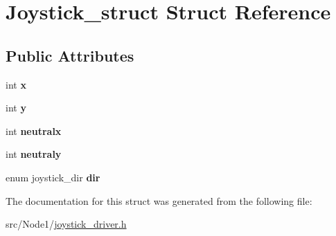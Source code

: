 \hypertarget{structJoystick__struct}{}\section{Joystick\+\_\+struct Struct Reference}
\label{structJoystick__struct}
\subsection*{Public Attributes}
\begin{DoxyCompactItemize}
\item 
int {\bfseries x}\hypertarget{structJoystick__struct_aaf659159d14638cbedd9d76e245add4d}{}\label{structJoystick__struct_aaf659159d14638cbedd9d76e245add4d}

\item 
int {\bfseries y}\hypertarget{structJoystick__struct_af599b5cdfa88bce2b811beaaa45c4e5e}{}\label{structJoystick__struct_af599b5cdfa88bce2b811beaaa45c4e5e}

\item 
int {\bfseries neutralx}\hypertarget{structJoystick__struct_a698d755f271379ee16d0d42c4cedc7ec}{}\label{structJoystick__struct_a698d755f271379ee16d0d42c4cedc7ec}

\item 
int {\bfseries neutraly}\hypertarget{structJoystick__struct_a67a0ae30231b6bbe948fe8f506e5a331}{}\label{structJoystick__struct_a67a0ae30231b6bbe948fe8f506e5a331}

\item 
enum joystick\+\_\+dir {\bfseries dir}\hypertarget{structJoystick__struct_a28ff078b3282c7a6898d66eafcbbd12c}{}\label{structJoystick__struct_a28ff078b3282c7a6898d66eafcbbd12c}

\end{DoxyCompactItemize}


The documentation for this struct was generated from the following file\+:\begin{DoxyCompactItemize}
\item 
src/\+Node1/\hyperlink{joystick__driver_8h}{joystick\+\_\+driver.\+h}\end{DoxyCompactItemize}

